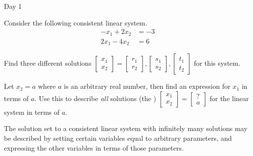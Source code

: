 \begin{applicationActivities}{Day 1}
\begin{activity}{0}
  Consider the following consistent linear system.
  \begin{align*}
  -x_1+2x_2  &= -3 \\
  2x_1-4x_2  &=  6
  \end{align*}
\begin{subactivity}
  Find three different solutions
  \(
    \begin{bmatrix}
      x_1 \\
      x_2
    \end{bmatrix}=
    \begin{bmatrix}
      r_1 \\
      r_2
    \end{bmatrix},
    \begin{bmatrix}
      s_1 \\
      s_2
    \end{bmatrix},
    \begin{bmatrix}
      t_1 \\
      t_2
    \end{bmatrix}
  \)
  for this system.
\end{subactivity}
\begin{subactivity}
  Let \(x_2=a\) where \(a\) is an arbitrary real number, then find an
  expression for \(x_1\) in terms of \(a\). Use this to describe \textit{all}
  solutions (the )
  \(
    \begin{bmatrix}
      x_1 \\
      x_2
    \end{bmatrix}=
    \begin{bmatrix}
      ? \\
      a
    \end{bmatrix}
  \)
  for the linear system in terms of \(a\).
\end{subactivity}
\end{activity}

\begin{remark}
  The solution set to a consistent linear system with infinitely many solutions
  may be described by setting
  certain variables equal to arbitrary parameters, and expressing the
  other variables in terms of those parameters.
\end{remark}


\end{applicationActivities}
